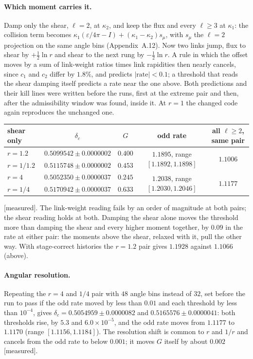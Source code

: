 \documentclass[11pt]{article}
\newcommand{\grade}[1]{\textsf{\small[#1]}}
\begin{document}
\paragraph{Which moment carries it.} Damp only the shear, $\ell=2$, at $\kappa_2$, and keep the flux and every $\ell\ge3$ at $\kappa_1$: the collision term becomes $\kappa_1(\varepsilon/4\pi-I)+(\kappa_1-\kappa_2)s_\mu$, with $s_\mu$ the $\ell=2$ projection on the same angle bins (Appendix~A.12). Now two links jump, flux to shear by $+\tfrac12\ln r$ and shear to the next rung by $-\tfrac12\ln r$. A rule in which the offset moves by a sum of link-weight ratios times link rapidities then nearly cancels, since $c_1$ and $c_2$ differ by $1.8\%$, and predicts $|\text{rate}|<0.1$; a threshold that reads the shear damping itself predicts a rate near the one above. Both predictions and their kill lines were written before the runs, first at the extreme pair and then, after the admissibility window was found, inside it. At $r=1$ the changed code again reproduces the unchanged one.
\begin{center}\begin{tabular}{lcccc}\toprule
shear only & $\delta_c$ & $G$ & odd rate & all $\ell\ge2$, same pair\\\midrule
$r=1.2$ & $0.5099542\pm0.0000002$ & $0.400$ & \multirow{2}{*}{$1.1895$, range $[1.1892,1.1898]$} & \multirow{2}{*}{$1.1006$}\\
$r=1/1.2$ & $0.5115748\pm0.0000002$ & $0.453$ & & \\\midrule
$r=4$ & $0.5052350\pm0.0000037$ & $0.245$ & \multirow{2}{*}{$1.2038$, range $[1.2030,1.2046]$} & \multirow{2}{*}{$1.1177$}\\
$r=1/4$ & $0.5170942\pm0.0000037$ & $0.633$ & & \\\bottomrule\end{tabular}\end{center}
\grade{measured}. The link-weight reading fails by an order of magnitude at both pairs; the shear reading holds at both. Damping the shear alone moves the threshold more than damping the shear and every higher moment together, by $0.09$ in the rate at either pair: the moments above the shear, relaxed with it, pull the other way. With stage-correct histories the $r=1.2$ pair gives $1.1928$ against $1.1066$ (above).

\paragraph{Angular resolution.} Repeating the $r=4$ and $1/4$ pair with $48$ angle bins instead of $32$, set before the run to pass if the odd rate moved by less than $0.01$ and each threshold by less than $10^{-4}$, gives $\delta_c=0.5054959\pm0.0000082$ and $0.5165576\pm0.0000041$: both thresholds rise, by $5.3$ and $6.0\times10^{-5}$, and the odd rate moves from $1.1177$ to $1.1170$ (range $[1.1156,1.1184]$). The resolution shift is common to $r$ and $1/r$ and cancels from the odd rate to below $0.001$; it moves $G$ itself by about $0.002$ \grade{measured}.
\end{document}
